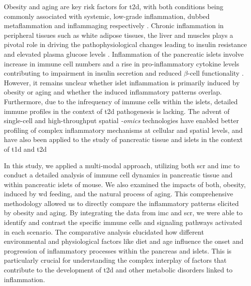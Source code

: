Obesity and aging are key risk factors for \gls{t2d}, with both conditions being commonly associated with systemic, low-grade inflammation, dubbed metaflammation and inflammaging respectively \textbf{\cite{schulze_dietary_2005,donath_inflammation_2013,prattichizzo_inflammageing_2018,lee_integrated_2018,ying_role_2019}}. Chronic inflammation in peripheral tissues such as white adipose tissues, the liver and muscles plays a pivotal role in driving the pathophysiological changes leading to insulin resistance and elevated plasma glucose levels \textbf{\cite{gregor_inflammatory_2011,hotamisligil_inflammation_2017}}. Inflammation of the pancreatic islets involve increase in immune cell numbers and a rise in pro-inflammatory cytokine levels contributing to impairment in insulin secretion and reduced $\beta$-cell functionality \textbf{\cite{ehses_increased_2007,boni-schnetzler_increased_2008,boni-schnetzler_islet_2019}}. However, it remains unclear whether islet inflammation is primarily induced by obesity or aging and whether the induced inflammatory patterns overlap. Furthermore, due to the infrequency of immune cells within the islets, detailed immune profiles in the context of \gls{t2d} pathogenesis is lacking. The advent of single-cell and high-throughput spatial \textit{-omics} technologies have enabled better profiling of complex inflammatory mechanisms at cellular and spatial levels, and have also been applied to the study of pancreatic tissue and islets in the context of \gls{t1d} \textbf{\cite{ damond_map_2019, wang_multiplexed_2019,chiou_interpreting_2021}} and \gls{t2d} \textbf{\cite{wang_integrating_2023,weng_single_2023}}\\

\par  In this study, we applied a multi-modal approach, utilizing both \acrfull{scr} and \acrfull{imc} to conduct a detailed analysis of immune cell dynamics in pancreatic tissue and within pancreatic islets of mouse. We also examined the impacts of both, obesity, induced by \gls{wd} feeding, and the natural process of aging. This comprehensive methodology allowed us to directly compare the inflammatory patterns elicited by obesity and aging. By integrating the data from \gls{imc} and \gls{scr}, we were able to identify and contrast the specific immune cells and signaling pathways activated in each scenario. The comparative analysis elucidated how different environmental and physiological factors like diet and age influence the onset and progression of inflammatory processes within the pancreas and islets. This is particularly crucial for understanding the complex interplay of factors that contribute to the development of \gls{t2d} and other metabolic disorders linked to inflammation.

